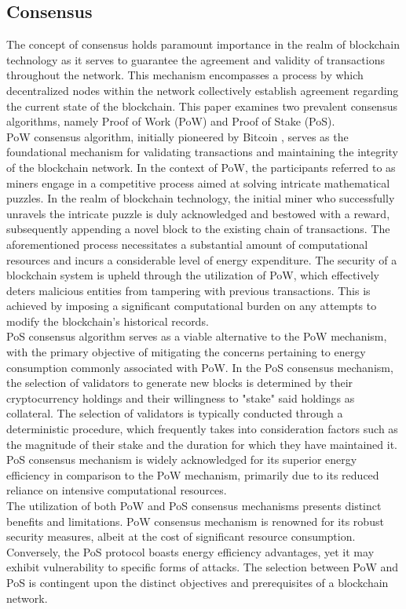 \documentclass[../../Main.tex]{subfiles}
\begin{document}
\subsection{Consensus}
The concept of consensus holds paramount importance in the realm of blockchain technology as it serves to guarantee the agreement and validity of transactions throughout the network. This mechanism encompasses a process by which decentralized nodes within the network collectively establish agreement regarding the current state of the blockchain. This paper examines two prevalent consensus algorithms, namely Proof of Work (PoW) and Proof of Stake (PoS).\\
\indent PoW consensus algorithm, initially pioneered by Bitcoin \cite{Bitcoin}, serves as the foundational mechanism for validating transactions and maintaining the integrity of the blockchain network. In the context of PoW, the participants referred to as miners engage in a competitive process aimed at solving intricate mathematical puzzles. In the realm of blockchain technology, the initial miner who successfully unravels the intricate puzzle is duly acknowledged and bestowed with a reward, subsequently appending a novel block to the existing chain of transactions. The aforementioned process necessitates a substantial amount of computational resources and incurs a considerable level of energy expenditure. The security of a blockchain system is upheld through the utilization of PoW, which effectively deters malicious entities from tampering with previous transactions. This is achieved by imposing a significant computational burden on any attempts to modify the blockchain's historical records.\\
\indent PoS \cite{Ethereum} consensus algorithm serves as a viable alternative to the PoW mechanism, with the primary objective of mitigating the concerns pertaining to energy consumption commonly associated with PoW. In the PoS consensus mechanism, the selection of validators to generate new blocks is determined by their cryptocurrency holdings and their willingness to "stake" said holdings as collateral. The selection of validators is typically conducted through a deterministic procedure, which frequently takes into consideration factors such as the magnitude of their stake and the duration for which they have maintained it. PoS consensus mechanism is widely acknowledged for its superior energy efficiency in comparison to the PoW mechanism, primarily due to its reduced reliance on intensive computational resources.\\
\indent The utilization of both PoW and PoS consensus mechanisms presents distinct benefits and limitations. PoW consensus mechanism is renowned for its robust security measures, albeit at the cost of significant resource consumption. Conversely, the PoS protocol boasts energy efficiency advantages, yet it may exhibit vulnerability to specific forms of attacks. The selection between PoW and PoS is contingent upon the distinct objectives and prerequisites of a blockchain network.\\
\end{document}
